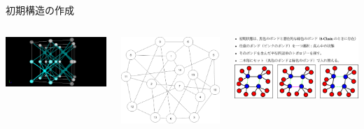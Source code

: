 \documentclass[aspectratio=169,11pt, dvipdfmx]{beamer}
\begin{document}
\begin{frame}
\begin{block}{初期構造の作成}
		\vspace{-1mm}
		\begin{columns}[T, onlytextwidth]
				\includegraphics[width=.8\textwidth]{8_per.png}
				\vspace{-5mm}
				\begin{center}
					\includegraphics[width=.5\textwidth]{Network.png}
				\end{center}
				\includegraphics[width=.8\textwidth]{bond_exchg.png}
		\end{columns}
	\end{block}
\end{frame}
\end{document}
